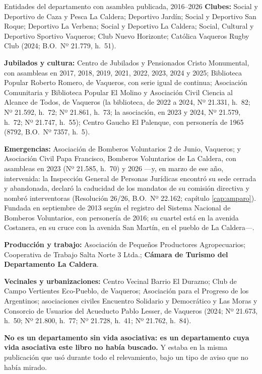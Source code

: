 \begin{ficha}{Entidades del departamento con asamblea publicada, 2016--2026}
\textbf{Clubes:} Social y Deportivo de Caza y Pesca La Caldera; Deportivo Jardín; Social y
Deportivo San Roque; Deportivo La Verbena; Social y Deportivo La Caldera; Social, Cultural y
Deportivo Sportivo Vaqueros; Club Nuevo Horizonte; Católica Vaqueros Rugby Club (2024; B.O.\ Nº 21.779, h.\ 51).

\textbf{Jubilados y cultura:} Centro de Jubilados y Pensionados Cristo Monumental, con
asambleas en 2017, 2018, 2019, 2021, 2022, 2023, 2024 y 2025; Biblioteca Popular Roberto
Romero, de Vaqueros, con serie igual de continua; Asociación Comunitaria y Biblioteca Popular El Molino y Asociación Civil Ciencia al Alcance de Todos, de Vaqueros (la biblioteca, de 2022 a 2024, Nº 21.331, h.\ 82; Nº 21.592, h.\ 72; Nº 21.861, h.\ 73; la asociación, en 2023 y 2024, Nº 21.579, h.\ 72; Nº 21.747, h.\ 55); Centro Gaucho El Palenque, con personería de 1965 (8792, B.O.\ Nº 7357, h.\ 5).

\textbf{Emergencias:} Asociación de Bomberos Voluntarios 2 de Junio, Vaqueros; y Asociación
Civil Papa Francisco, Bomberos Voluntarios de La Caldera, con asambleas en 2023 (Nº 21.585, h.\ 70) y 2026 ---y, en marzo de ese año, intervenida: la Inspección General de Personas Jurídicas encontró su sede cerrada y abandonada, declaró la caducidad de los mandatos de su comisión directiva y nombró interventoras (Resolución 26/26, B.O.\ Nº 22.162; capítulo \ref{cap:amparo}). Fundada en septiembre de 2013 según el registro del Sistema Nacional de Bomberos Voluntarios, con personería de 2016; su cuartel está en la avenida Costanera, en su cruce con la avenida San Martín, en el pueblo de La Caldera---.

\textbf{Producción y trabajo:} Asociación de Pequeños Productores Agropecuarios; Cooperativa de
Trabajo Salta Norte 3 Ltda.; \textbf{Cámara de Turismo del Departamento La Caldera}.

\textbf{Vecinales y urbanizaciones:} Centro Vecinal Barrio El Durazno; Club de Campo Vertientes
Eco-Pueblo, de Vaqueros; Asociación para el Progreso de los Argentinos; asociaciones civiles Encuentro Solidario y Democrático y Las Moras y Consorcio de Usuarios del Acueducto Pablo Lesser, de Vaqueros (2024; Nº 21.673, h.\ 50; Nº 21.800, h.\ 77; Nº 21.728, h.\ 41; Nº 21.762, h.\ 84).
\end{ficha}

\textbf{No es un departamento sin vida asociativa: es un departamento cuya vida asociativa este
libro no había buscado.} Y estaba en la misma publicación que usó durante todo el
relevamiento, bajo un tipo de aviso que no había mirado.


